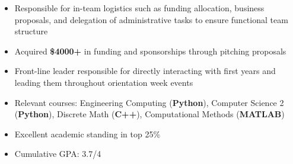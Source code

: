 
\medskip


\begin{itemize}
\item Responsible for in-team logistics such as funding allocation, business proposals, and delegation of administrative tasks to ensure functional team structure
\item Acquired \textbf{\$4000+} in funding and sponsorships through pitching proposals
\end{itemize}

\divider

\begin{itemize}
\item Front-line leader responsible for directly interacting with first years and leading them throughout orientation week events
\end{itemize}

\medskip


\medskip


\begin{itemize}
\item Relevant courses: Engineering Computing (\textbf{Python}), Computer Science 2 (\textbf{Python}), Discrete Math (\textbf{C++}), Computational Methods (\textbf{MATLAB})
\item Excellent academic standing in top 25\% 
\item Cumulative GPA: 3.7/4
\end{itemize}

